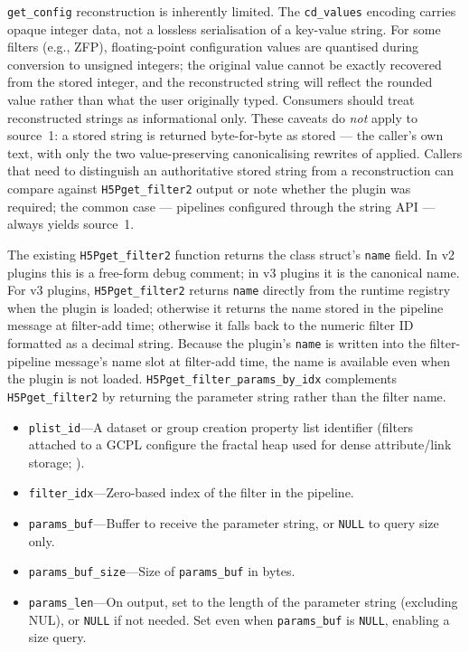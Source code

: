 \documentclass[../RFC-HDFG-2026-001.tex]{subfiles}
\begin{document}
\texttt{get\_config} reconstruction is inherently limited. The
\texttt{cd\_values} encoding carries opaque integer data, not a lossless
serialisation of a key-value string. For some filters (e.g., ZFP),
floating-point configuration values are quantised during conversion to
unsigned integers; the original value cannot be exactly recovered from the
stored integer, and the reconstructed string will reflect the rounded
value rather than what the user originally typed. Consumers should treat
reconstructed strings as informational only.  These caveats do \emph{not}
apply to source~1: a stored string is returned byte-for-byte as stored ---
the caller's own text, with only the two value-preserving canonicalising
rewrites of  applied.  Callers that need to distinguish an authoritative stored
string from a reconstruction can compare against
\texttt{H5Pget\_filter2} output or note whether the plugin was required;
the common case --- pipelines configured through the string API ---
always yields source~1.

The existing \texttt{H5Pget\_filter2} function returns the class
struct's \texttt{name} field.  In v2 plugins this is a free-form
debug comment; in v3 plugins it is the canonical name.  For v3
plugins, \texttt{H5Pget\_filter2} returns \texttt{name} directly from
the runtime registry when the plugin is loaded; otherwise it returns
the name stored in the pipeline message at filter-add time;
otherwise it falls back to the numeric filter ID formatted as a
decimal string.  Because the plugin's \texttt{name} is written into
the filter-pipeline message's name slot at filter-add time, the name
is available even when the plugin is not loaded.
\texttt{H5Pget\_filter\_params\_by\_idx} complements \texttt{H5Pget\_filter2}
by returning the parameter string rather than the filter name.


\begin{itemize}
\item \texttt{plist\_id}---A dataset or group creation property list
  identifier (filters attached to a GCPL configure the fractal heap used
  for dense attribute/link storage; ).
\item \texttt{filter\_idx}---Zero-based index of the filter in the pipeline.
\item \texttt{params\_buf}---Buffer to receive the parameter string, or \texttt{NULL}
  to query size only.
\item \texttt{params\_buf\_size}---Size of \texttt{params\_buf} in bytes.
\item \texttt{params\_len}---On output, set to the length of the parameter string
  (excluding NUL), or \texttt{NULL} if not needed. Set even when \texttt{params\_buf}
  is \texttt{NULL}, enabling a size query.
\end{itemize}
\end{document}
